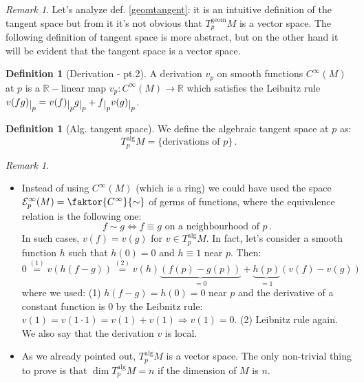 \documentclass[a4paper,11pt,titlepage, article, oneside]{memoir}
\numberwithin{equation}{section}
\theoremstyle{definition}
\newtheorem{definition}[theorem]{Definition}
\theoremstyle{remark}
\newtheorem{remark}[theorem]{Remark}
\newcommand{\rfield}{\mathbb{R}}
\newcommand{\restrict}[2]{{#1}\raisebox{-.5ex}{$|$}_{#2}}
\newcommand{\tangentgeom}[1]{T_{#1}^{\text{geom}}}
\newcommand{\tangentalg}[1]{T_{#1}^{\text{alg}}}
\begin{document}
\begin{remarkbox}\begin{remark}
Let's analyze def. \ref{geomtangent}: it is an intuitive definition of the tangent space but from it it's not obvious that $\tangentgeom{p} M$ is a vector space. The following definition of tangent space is more abstract, but on the other hand it will be evident that the tangent space is a vector space.
\end{remark}\end{remarkbox}

\begin{definition}[Derivation - pt.2]
A derivation $v_p$ on smooth functions $C^{\infty}(M)$ at $p$ is a $\rfield-$linear map $v_p \colon C^{\infty}(M) \rightarrow \rfield$ which satisfies the Leibnitz rule $\restrict{v(fg)}{p} = \restrict{v(f)}{p} \restrict{g}{p} + \restrict{f}{p}\restrict{v(g)}{p}$.
\end{definition}

\begin{definition}[Alg. tangent space]
We define the algebraic tangent space at $p$ as:
\begin{equation*}
\tangentalg{p} M = \{\text{derivations of } p \} \, .
\end{equation*}
\end{definition}

\begin{remarkbox}\begin{remark}
$ $
\begin{itemize}
\item Instead of using $C^{\infty}(M)$ (which is a ring) we could have used the space $\mathcal{E}^{\infty}_p (M) = \faktor{C^{\infty}}{\sim}$ of germs of functions, where the equivalence relation is the following one:
$$f \sim g \Leftrightarrow f \equiv g \text{ on a neighbourhood of } p \, .$$
In such cases, $v(f) = v(g)$ for $v \in \tangentalg{p} M$. In fact, let's consider a smooth function $h$ such that $h(0)=0$ and $h \equiv 1$ near $p$. Then:
$$0 \overset{(1)} {=} v\left(h(f-g)\right) \overset{(2)}{=} v(h)\underbrace{\left(f(p) - g(p)\right)}_{=0} + \underbrace{h(p)}_{=1}\left (v(f) - v(g) \right)$$
where we used: (1) $h(f-g) = h(0) = 0$ near $p$ and the derivative of a constant function is 0 by the Leibnitz rule: $v(1) = v(1\cdot 1) = v(1)+v(1) \Rightarrow v(1)=0$. (2) Leibnitz rule again.
We also say that the derivation $v$ is local.
\item As we already pointed out, $\tangentalg{p} M$ is a vector space. The only non-trivial thing to prove is that $\dim \tangentalg {p}M = n$ if the dimension of $M$ is $n$.
\end{itemize}
\end{remark}\end{remarkbox}
\end{document}
